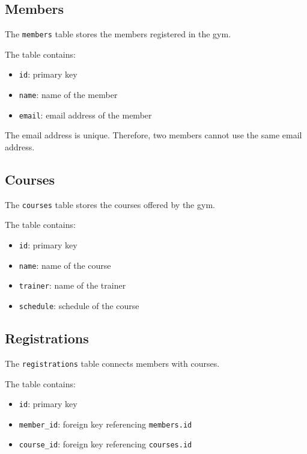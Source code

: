 \documentclass[12pt,a4paper]{article}
\begin{document}
\subsection{Members}

The \texttt{members} table stores the members registered in
the gym.

The table contains:

\begin{itemize}
    \item \texttt{id}: primary key
    \item \texttt{name}: name of the member
    \item \texttt{email}: email address of the member
\end{itemize}

The email address is unique. Therefore, two members cannot
use the same email address.


\subsection{Courses}

The \texttt{courses} table stores the courses offered by the
gym.

The table contains:

\begin{itemize}
    \item \texttt{id}: primary key
    \item \texttt{name}: name of the course
    \item \texttt{trainer}: name of the trainer
    \item \texttt{schedule}: schedule of the course
\end{itemize}


\subsection{Registrations}

The \texttt{registrations} table connects members with
courses.

The table contains:

\begin{itemize}
    \item \texttt{id}: primary key
    \item \texttt{member\_id}: foreign key referencing
    \texttt{members.id}
    \item \texttt{course\_id}: foreign key referencing
    \texttt{courses.id}
\end{itemize}
\end{document}
